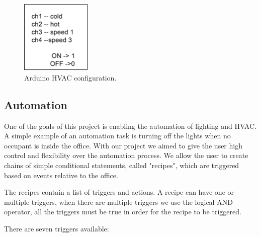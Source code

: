 \begin{figure}[h]
\centering
\includegraphics[width=0.3\textwidth]{Figures/temperature_post_imp}
\caption{Arduino HVAC configuration.}
\label{arduino_post_imp}
\end{figure}









\subsection{Automation}

One of the goals of this project is enabling the automation of lighting and \ac{HVAC}. A simple example of an automation task is turning off the lights when no occupant is inside the office.
With our project we aimed to give the user high control and flexibility over the automation process. We allow the user to create chains of simple conditional statements, called "recipes", which are triggered based on events relative to the office.


The recipes contain a list of triggers and actions. A recipe can have one or multiple triggers, when there are multiple triggers we use the logical AND operator, all the triggers must be true in order for the recipe to be triggered.

There are seven triggers available:

